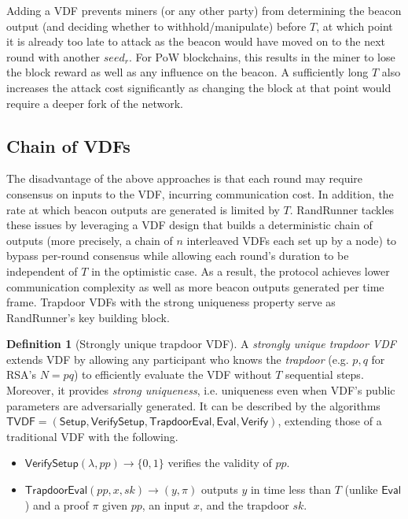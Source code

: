 \documentclass[letterpaper,twocolumn,10pt]{article}
\theoremstyle{definition}
\newtheorem{definition}[theorem]{Definition}
\theoremstyle{remark}
\begin{document}
Adding a VDF prevents miners (or any other party) from determining the beacon output (and deciding whether to withhold/manipulate) before $T$, at which point it is already too late to attack as the beacon would have moved on to the next round with another $seed_r$. For PoW blockchains, this results in the miner to lose the block reward as well as any influence on the beacon. A sufficiently long $T$ also increases the attack cost significantly as changing the block at that point would require a deeper fork of the network. 
\fi

\subsection{Chain of VDFs}
\label{subsection:randrunner}
The disadvantage of the above approaches is that each round may require consensus on inputs to the VDF, incurring communication cost. In addition, the rate at which beacon outputs are generated is limited by $T$. RandRunner \cite{schindler2021randrunner} tackles these issues by leveraging a VDF design that builds a deterministic chain of outputs (more precisely, a chain of $n$ interleaved VDFs each set up by a node) to bypass per-round consensus while allowing each round's duration to be independent of $T$ in the optimistic case. As a result, the protocol achieves lower communication complexity as well as more beacon outputs generated per time frame. Trapdoor VDFs \cite{wesolowski2019efficient} with the strong uniqueness property \cite{schindler2021randrunner} serve as RandRunner's key building block.

\begin{definition}[Strongly unique trapdoor VDF]
A \textit{strongly unique trapdoor VDF} extends VDF by allowing any participant who knows the \textit{trapdoor} (e.g. $p, q$ for RSA's $N = p q$) to efficiently evaluate the VDF without $T$ sequential steps. Moreover, it provides \textit{strong uniqueness}, i.e. uniqueness even when VDF's public parameters are adversarially generated. It can be described by the algorithms $\mathsf{TVDF} = (\mathsf{Setup}, \mathsf{VerifySetup}, \mathsf{TrapdoorEval}, \mathsf{Eval}, \mathsf{Verify})$, extending those of a traditional VDF with the following.
\begin{itemize}
    \item $\mathsf{VerifySetup}(\lambda, pp) \rightarrow \{0, 1\}$ verifies the validity of $pp$.
    \item $\mathsf{TrapdoorEval}(pp, x, sk) \rightarrow (y, \pi)$ outputs $y$ in time less than $T$ (unlike $\mathsf{Eval}$) and a proof $\pi$ given $pp$, an input $x$, and the trapdoor $sk$.
\end{itemize}
\end{definition}
\end{document}
